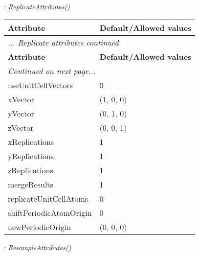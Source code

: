 \documentclass[10pt,a4paper]{report}
\begin{document}
\newpage

{}
: {\it ReplicateAttributes() }\\[-3mm]

\begin{longtable}{ll}
{\bf Attribute} & {\bf Default/Allowed values} \\
\hline \hline
\endfirsthead
\multicolumn{2}{l}{{\it ... Replicate attributes continued}} \\
{\bf Attribute} & {\bf Default/Allowed values} \\
\hline \hline
\endhead
\hline
\multicolumn{2}{l}{{\it Continued on next page...}} \\
\endfoot
\hline
\endlastfoot

useUnitCellVectors  &  0 \\
xVector  &  (1, 0, 0) \\
yVector  &  (0, 1, 0) \\
zVector  &  (0, 0, 1) \\
xReplications  &  1 \\
yReplications  &  1 \\
zReplications  &  1 \\
mergeResults  &  1 \\
replicateUnitCellAtoms  &  0 \\
shiftPeriodicAtomOrigin  &  0 \\
newPeriodicOrigin  &  (0, 0, 0) \\
\end{longtable}

\newpage

{}
: {\it ResampleAttributes() }\\[-3mm]
\end{document}
